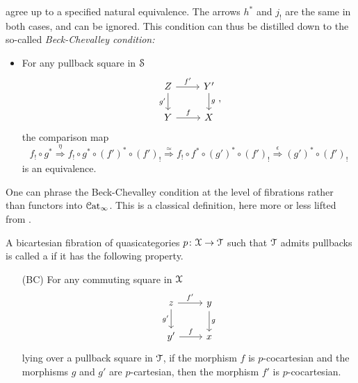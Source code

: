 \documentclass[main.tex]{subfiles}
\begin{document}
agree up to a specified natural equivalence. The arrows $h^{*}$ and $j_{!}$ are the same in both cases, and can be ignored. This condition can thus be distilled down to the so-called \emph{Beck-Chevalley condition:}
\begin{itemize}
  \item For any pullback square in $\S$
    \begin{equation*}
      \begin{tikzcd}
        Z
        \arrow[r, "f'"]
        \arrow[d, swap, "g'"]
        & Y'
        \arrow[d, "g"]
        \\
        Y
        \arrow[r, "f"]
        & X
      \end{tikzcd},
    \end{equation*}
    the comparison map
    \begin{equation*}
      f_{!} \circ g^{*} \overset{\eta}{\Rightarrow} f_{!} \circ g^{*} \circ (f')^{*} \circ (f')_{!} \overset{\simeq}{\Rightarrow} f_{!} \circ f^{*} \circ (g')^{*} \circ (f')_{!} \overset{\epsilon}{\Rightarrow} (g')^{*} \circ (f')_{!}
    \end{equation*}
    is an equivalence.
\end{itemize}

One can phrase the Beck-Chevalley condition at the level of fibrations rather than functors into $\ICat$. This is a classical definition, here more or less lifted from \cite{luriehopkins2013ambidexterity}.

\begin{definition}
  \label{def:beck_chevalley_fibration}
  A bicartesian fibration of quasicategories $p\colon \category{X} \to \category{T}$ such that $\category{T}$ admits pullbacks is called a  if it has the following property.
  \begin{itemize}
    \item[(BC)]\label{item:beck_chevalley_condition} For any commuting square in $\category{X}$
      \begin{equation*}
        \begin{tikzcd}
          z
          \arrow[r, "f'"]
          \arrow[d, swap, "g'"]
          & y
          \arrow[d, "g"]
          \\
          y'
          \arrow[r, "f"]
          & x
        \end{tikzcd}
      \end{equation*}
      lying over a pullback square in $\category{T}$, if the morphism $f$ is $p$-cocartesian and the morphisms $g$ and $g'$ are $p$-cartesian, then the morphism $f'$ is $p$-cocartesian.
  \end{itemize}
\end{definition}
\end{document}
